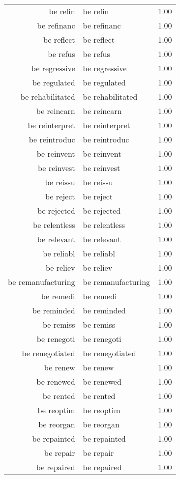 \begin{table}[ht]
\begin{tabular}{rlr}
  be refin & be refin & 1.00 \\ 
  be refinanc & be refinanc & 1.00 \\ 
  be reflect & be reflect & 1.00 \\ 
  be refus & be refus & 1.00 \\ 
  be regressive & be regressive & 1.00 \\ 
  be regulated & be regulated & 1.00 \\ 
  be rehabilitated & be rehabilitated & 1.00 \\ 
  be reincarn & be reincarn & 1.00 \\ 
  be reinterpret & be reinterpret & 1.00 \\ 
  be reintroduc & be reintroduc & 1.00 \\ 
  be reinvent & be reinvent & 1.00 \\ 
  be reinvest & be reinvest & 1.00 \\ 
  be reissu & be reissu & 1.00 \\ 
  be reject & be reject & 1.00 \\ 
  be rejected & be rejected & 1.00 \\ 
  be relentless & be relentless & 1.00 \\ 
  be relevant & be relevant & 1.00 \\ 
  be reliabl & be reliabl & 1.00 \\ 
  be reliev & be reliev & 1.00 \\ 
  be remanufacturing & be remanufacturing & 1.00 \\ 
  be remedi & be remedi & 1.00 \\ 
  be reminded & be reminded & 1.00 \\ 
  be remiss & be remiss & 1.00 \\ 
  be renegoti & be renegoti & 1.00 \\ 
  be renegotiated & be renegotiated & 1.00 \\ 
  be renew & be renew & 1.00 \\ 
  be renewed & be renewed & 1.00 \\ 
  be rented & be rented & 1.00 \\ 
  be reoptim & be reoptim & 1.00 \\ 
  be reorgan & be reorgan & 1.00 \\ 
  be repainted & be repainted & 1.00 \\ 
  be repair & be repair & 1.00 \\ 
  be repaired & be repaired & 1.00 \\ 

\end{tabular}
\end{table}
